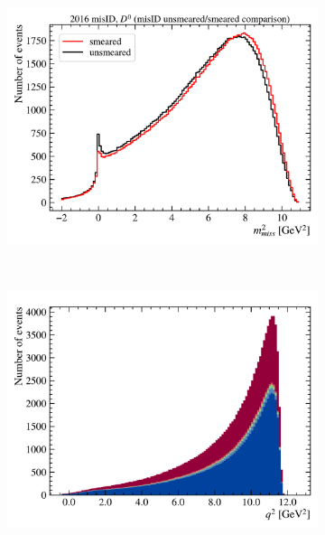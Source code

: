 \begin{figure}[!htb]
    \hfill
    \begin{subfigure}[b]{0.32\textwidth}
        \centering
        \includegraphics[width=\textwidth]{figs-fit-fit-templates/data-driven-plots/misid/D0_mm2_comp.pdf}
    \end{subfigure}
    \\
    \begin{subfigure}[b]{0.32\textwidth}
        \centering
        \includegraphics[width=\textwidth]{figs-fit-fit-templates/data-driven-plots/misid/D0_q2.pdf}
    \end{subfigure}
    \hfill
    \begin{subfigure}[b]{0.32\textwidth}
        \centering

\end{subfigure}
\end{figure}
